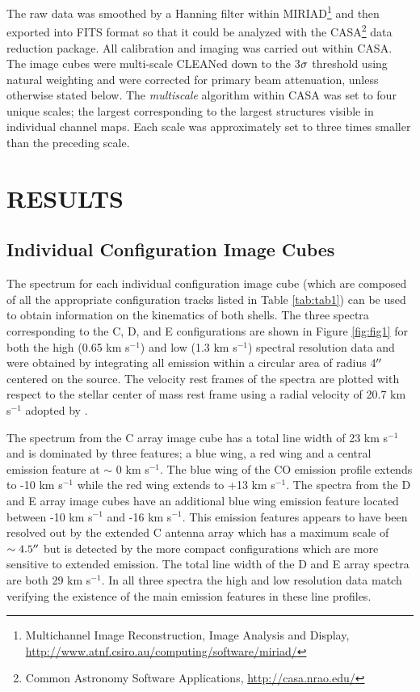 \documentclass[preprint2]{aastex}
\begin{document}
The raw data was smoothed by a Hanning filter within MIRIAD\footnote{Multichannel Image Reconstruction, Image Analysis and Display, \url{http://www.atnf.csiro.au/computing/software/miriad/}} and then exported into FITS format so that it could be analyzed with the CASA\footnote{Common Astronomy Software Applications, \url{http://casa.nrao.edu/}} data reduction package. All calibration and imaging was carried out within CASA. The image cubes  were multi-scale  CLEANed down to the 3$\rm{\sigma}$ threshold using natural weighting and were corrected for primary beam attenuation, unless otherwise stated below. The \textit{multiscale} algorithm \citep{rich08} within CASA was set to four unique scales; the largest corresponding to the largest structures visible in individual channel maps. Each scale was approximately set to three times smaller than the preceding scale. 

\section{RESULTS} 

\subsection{Individual Configuration Image Cubes} \label{results1} %

The spectrum for each individual configuration image cube (which are composed of all the appropriate configuration tracks listed in Table \ref{tab:tab1}) can be used to obtain information on the kinematics of both shells. The three spectra corresponding  to the C, D, and E configurations are shown in Figure \ref{fig:fig1} for both the high (0.65 km s${}^{-1}$) and low (1.3 km s${}^{-1}$) spectral resolution data and were obtained by integrating all emission within a circular area of radius 4$\mbox{$^{\prime\prime}$}$ centered on the source. The velocity rest frames of the spectra are plotted with respect to the stellar center of mass rest frame using a radial velocity of 20.7 km s${}^{-1}$  adopted by \citet{harp08}.

The spectrum from the C array image cube has a total line width of 23 km s${}^{-1}$ and is dominated by three features; a blue wing, a red wing and a central emission feature at $\sim$ 0 km s${}^{-1}$. The blue wing of the CO emission profile extends to -10 km s${}^{-1}$ while the red wing extends to +13 km s${}^{-1}$. The spectra from the D and E array image cubes have an additional blue wing emission feature located between -10 km s${}^{-1}$ and -16 km s${}^{-1}$. This emission features appears to have been resolved out by the extended C antenna array which has a maximum scale of $\sim 4.5 \mbox{$^{\prime\prime}$}$ but is detected by the more compact configurations which are more sensitive to extended emission. The total line width of the D and E array spectra are both 29 km s${}^{-1}$. In all three spectra the high and low resolution data match verifying the existence of the main emission features in these line profiles.
\end{document}
